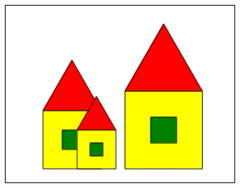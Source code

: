 \vskip 0.5cm

\begin{figure}[H]
   \includegraphics[width=10.0cm,trim=4 4 8 4,clip]{./images/incapsulare/incapsulare-4.png}
   \label{inc-5}
\end{figure}

\vskip 0.5cm

